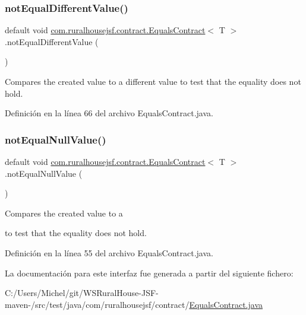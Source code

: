 \subsubsection{\texorpdfstring{notEqualDifferentValue()}{notEqualDifferentValue()}}
{\footnotesize\ttfamily default void \mbox{\hyperlink{interfacecom_1_1ruralhousejsf_1_1contract_1_1_equals_contract}{com.\+ruralhousejsf.\+contract.\+Equals\+Contract}}$<$ T $>$.not\+Equal\+Different\+Value (\begin{DoxyParamCaption}{ }\end{DoxyParamCaption})}

Compares the created value to a different value to test that the equality does not hold. 

Definición en la línea 66 del archivo Equals\+Contract.\+java.

\mbox{\label{interfacecom_1_1ruralhousejsf_1_1contract_1_1_equals_contract_adda6a50dc1babeb3783fd92a09aac788}} 
\subsubsection{\texorpdfstring{notEqualNullValue()}{notEqualNullValue()}}
{\footnotesize\ttfamily default void \mbox{\hyperlink{interfacecom_1_1ruralhousejsf_1_1contract_1_1_equals_contract}{com.\+ruralhousejsf.\+contract.\+Equals\+Contract}}$<$ T $>$.not\+Equal\+Null\+Value (\begin{DoxyParamCaption}{ }\end{DoxyParamCaption})}

Compares the created value to a
\begin{DoxyCode}{0}
\DoxyCodeLine{\textcolor{keyword}{null} }
\end{DoxyCode}
 to test that the equality does not hold. 

Definición en la línea 55 del archivo Equals\+Contract.\+java.



La documentación para este interfaz fue generada a partir del siguiente fichero\+:\begin{DoxyCompactItemize}
\item 
C\+:/\+Users/\+Michel/git/\+W\+S\+Rural\+House-\/\+J\+S\+F-\/maven-\//src/test/java/com/ruralhousejsf/contract/\mbox{\hyperlink{_equals_contract_8java}{Equals\+Contract.\+java}}\end{DoxyCompactItemize}

